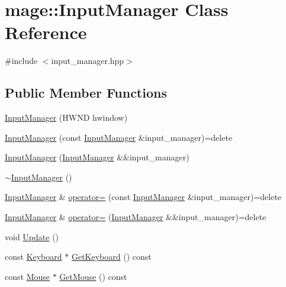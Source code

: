 \hypertarget{classmage_1_1_input_manager}{}\section{mage\+:\+:Input\+Manager Class Reference}
\label{classmage_1_1_input_manager}


{\ttfamily \#include $<$input\+\_\+manager.\+hpp$>$}

\subsection*{Public Member Functions}
\begin{DoxyCompactItemize}
\item 
\hyperlink{classmage_1_1_input_manager_afc28df27a0251c242113a9761c007534}{Input\+Manager} (H\+W\+ND hwindow)
\item 
\hyperlink{classmage_1_1_input_manager_a68503617f418bf270dc39bb18019b46d}{Input\+Manager} (const \hyperlink{classmage_1_1_input_manager}{Input\+Manager} \&input\+\_\+manager)=delete
\item 
\hyperlink{classmage_1_1_input_manager_ae9e37a3157c7880aa09226e56c4e97c4}{Input\+Manager} (\hyperlink{classmage_1_1_input_manager}{Input\+Manager} \&\&input\+\_\+manager)
\item 
\hyperlink{classmage_1_1_input_manager_a287ca0e91ec079227c102f7eadd5bb46}{$\sim$\+Input\+Manager} ()
\item 
\hyperlink{classmage_1_1_input_manager}{Input\+Manager} \& \hyperlink{classmage_1_1_input_manager_ad9caa8b7e99a69b774887f342bd5dda0}{operator=} (const \hyperlink{classmage_1_1_input_manager}{Input\+Manager} \&input\+\_\+manager)=delete
\item 
\hyperlink{classmage_1_1_input_manager}{Input\+Manager} \& \hyperlink{classmage_1_1_input_manager_ae7c1c4d2d55d86cbc88a5fbc2f1279a8}{operator=} (\hyperlink{classmage_1_1_input_manager}{Input\+Manager} \&\&input\+\_\+manager)=delete
\item 
void \hyperlink{classmage_1_1_input_manager_a5e516969ff4ae9876b98c28f48f93726}{Update} ()
\item 
const \hyperlink{classmage_1_1_keyboard}{Keyboard} $\ast$ \hyperlink{classmage_1_1_input_manager_a5b72139e30d1f3da6cda50f2989c1350}{Get\+Keyboard} () const
\item 
const \hyperlink{classmage_1_1_mouse}{Mouse} $\ast$ \hyperlink{classmage_1_1_input_manager_ad268916e07f44e40bf267efa0e673186}{Get\+Mouse} () const
\end{DoxyCompactItemize}
